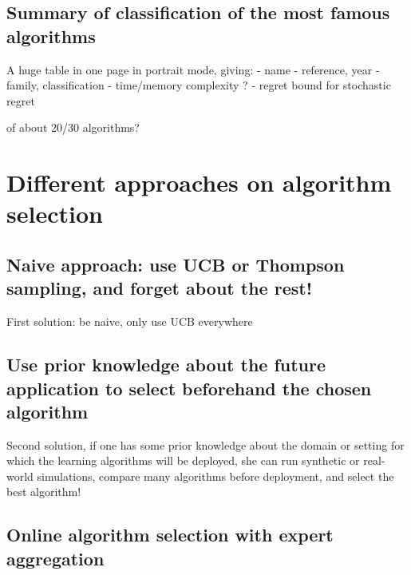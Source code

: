 \subsection{Summary of classification of the most famous algorithms}

A huge table in one page in portrait mode, giving:
- name
- reference, year
- family, classification
- time/memory complexity ?
- regret bound for stochastic regret

of about 20/30 algorithms?


\section{Different approaches on algorithm selection}
\label{sec:2:chooseYourPreferredBanditAlgorithm}

\subsection{Naive approach: use UCB or Thompson sampling, and forget about the rest!}
First solution: be naive, only use UCB everywhere

\subsection{Use prior knowledge about the future application to select beforehand the chosen algorithm}
Second solution, if one has some prior knowledge about the domain or setting for which the learning algorithms will be deployed, she can run synthetic or real-world simulations, compare many algorithms before deployment, and select the best algorithm!

\subsection{Online algorithm selection with expert aggregation}






